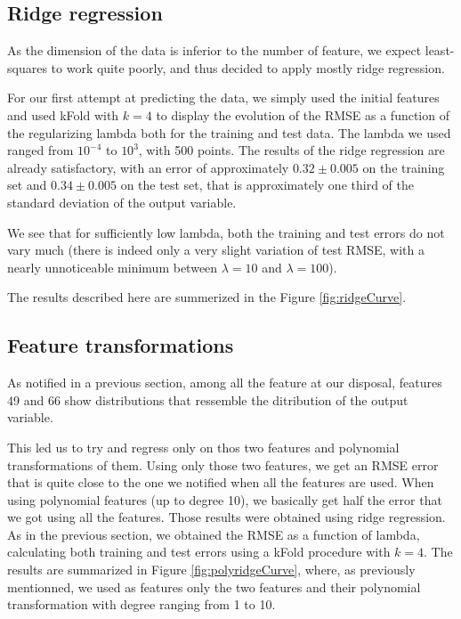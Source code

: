 \documentclass{article} %
\begin{document}
\begin{figure}[!t]
{\label{fig:xhist49}}
\hspace*{0.3in}
\caption{}
\end{figure}

\subsection{Ridge regression}
As the dimension of the data is inferior to the number of feature, we expect
least-squares to work quite poorly, and thus decided to apply mostly ridge
regression.

For our first attempt at predicting the data, we simply used the initial
features and used kFold with $k=4$ to display the evolution of the RMSE as a
function of the regularizing lambda both for the training and test data. 
The lambda we used ranged from $10^{-4}$ to
$10^3$, with 500 points. The results of the ridge regression are already
satisfactory, with an error of approximately $0.32\pm0.005$ on the training set
and $0.34\pm0.005$ on the test set, that is approximately one third of the
standard deviation of the output variable.

We see that for sufficiently low lambda, both the training and test errors do
not vary much (there is indeed only a very slight variation of test RMSE, with a
nearly unnoticeable minimum between $\lambda=10$ and $\lambda=100$).

The results described here are summerized in the Figure \ref{fig:ridgeCurve}.

\subsection{Feature transformations}
As notified in a previous section, among all the feature at our disposal,
features 49 and 66 show distributions that ressemble the ditribution of the
output variable. 

This led us to try and regress only on thos two features and polynomial
transformations of them. Using only those two features, we get an RMSE error
that is quite close to the one we notified when all the features are used. When
using polynomial features (up to degree 10), we basically get half the error
that we got using all the features. Those results were obtained using ridge
regression. As in the previous section, we obtained the RMSE as a function of
lambda, calculating both training and test errors using a kFold procedure with
$k=4$. The results are summarized in Figure \ref{fig:polyridgeCurve}, where, as
previously mentionned, we used as features only the two features and their
polynomial transformation with degree ranging from 1 to 10.
\end{document}
